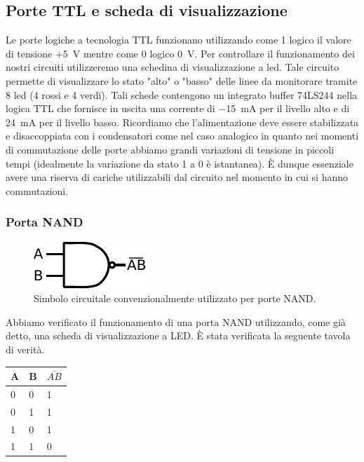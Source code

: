 \subsection{Porte TTL e scheda di visualizzazione}
Le porte logiche a tecnologia TTL funzionano utilizzando come 1 logico il valore di tensione +\SI{5}{\volt} mentre come 0 logico \SI{0}{\volt}. Per controllare il funzionamento dei nostri circuiti utilizzeremo una schedina di visualizzazione a led. Tale circuito permette di visualizzare lo stato "alto" o "basso" delle linee da monitorare tramite 8 led (4 rossi e 4 verdi). Tali schede contengono un integrato buffer 74LS244 nella logica TTL che fornisce in uscita una corrente di \SI{-15}{\milli\ampere} per il livello alto e di \SI{24}{\milli\ampere} per il livello basso.
Ricordiamo che l'alimentazione deve essere stabilizzata e disaccoppiata con i condensatori come nel caso analogico in quanto nei momenti di commutazione delle porte abbiamo grandi variazioni di tensione in piccoli tempi (idealmente la variazione da stato 1 a 0 è istantanea). È dunque essenziale avere una riserva di cariche utilizzabili dal circuito nel momento in cui si hanno commutazioni.

\subsubsection{Porta NAND}

\begin{figure}
\centering
\includegraphics[width=.15\textwidth]{../E09/latex/NAND.pdf}
\caption{Simbolo circuitale convenzionalmente utilizzato per porte NAND.}
\label{cir9:nand}
\end{figure}

Abbiamo verificato il funzionamento di una porta NAND utilizzando, come già detto, una scheda di visualizzazione a LED. È stata verificata la seguente tavola di verità. 



\begin{tabular}{|l|l|l|}
\hline
A & B & $\overline{AB}$ \\
\hline
0 & 0 & 1\\
\hline
0 & 1 & 1\\
\hline
1 & 0 & 1\\
\hline
1 & 1 & 0\\
\hline
\end{tabular}

